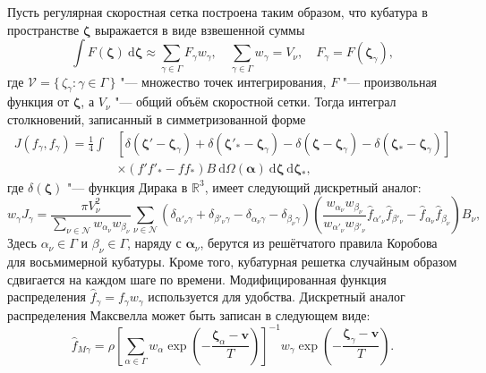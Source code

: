 \documentclass[10pt]{article}
\newcommand{\dd}{\:\mathrm{d}}
\newcommand{\dzeta}{\boldsymbol{\dd\zeta}}
\newcommand{\bzeta}{\boldsymbol{\zeta}}
\newcommand{\Nu}{\mathcal{N}}
\newcommand{\Set}[2]{\{\,{#1}:{#2}\,\}}
\begin{document}
Пусть регулярная скоростная сетка построена таким образом,
что кубатура в пространстве \(\bzeta\) выражается в виде взвешенной суммы
\begin{equation}\label{eq:zeta_cubature}
    \int F(\bzeta) \dzeta \approx \sum_{\gamma\in\Gamma} F_\gamma w_\gamma,
        \quad \sum_{\gamma\in\Gamma} w_\gamma = V_\nu,
        \quad F_\gamma = F(\bzeta_\gamma),
\end{equation}
где \(\mathcal{V} = \Set{\zeta_\gamma}{\gamma\in\Gamma}\) "--- множество точек интегрирования,
\(F\) "--- произвольная функция от \(\bzeta\),
а \(V_\nu\) "--- общий объём скоростной сетки.
Тогда интеграл столкновений, записанный в симметризованной форме
\begin{equation}\label{eq:symm_ci}
    \begin{aligned}
    J(f_\gamma, f_\gamma) = \frac14\int &\left[
        \delta(\bzeta'-\bzeta_\gamma) + \delta(\bzeta'_*-\bzeta_\gamma)
        - \delta(\bzeta-\bzeta_\gamma) - \delta(\bzeta_*-\bzeta_\gamma)\right] \\
        &\times(f'f'_* - ff_*)B \dd\Omega(\boldsymbol{\alpha}) \dzeta\dzeta_*,
    \end{aligned}
\end{equation}
где \(\delta(\bzeta)\) "--- функция Дирака в \(\mathbb{R}^3\),
имеет следующий дискретный аналог:
\begin{equation}\label{eq:discrete_symm_ci}
    w_\gamma J_\gamma = \frac{\pi V_\nu^2}{\sum_{\nu\in\Nu} w_{\alpha_\nu}w_{\beta_\nu}}
        \sum_{\nu\in\Nu} \left(
            \delta_{\alpha'_\nu\gamma} + \delta_{\beta'_\nu\gamma}
            - \delta_{\alpha_\nu\gamma} - \delta_{\beta_\nu\gamma}
        \right)\left(
            \frac{w_{\alpha_\nu}w_{\beta_\nu}}{w_{\alpha'_\nu}w_{\beta'_\nu}}
            \hat{f}_{\alpha'_\nu}\hat{f}_{\beta'_\nu} - \hat{f}_{\alpha_\nu}\hat{f}_{\beta_\nu}
        \right)B_\nu,
\end{equation}
Здесь \(\alpha_\nu\in\Gamma\) и \(\beta_\nu\in\Gamma\), наряду с \(\boldsymbol{\alpha}_\nu\),
берутся из решётчатого правила Коробова~\cite{Korobov1959, Sloan1994}
для восьмимерной кубатуры.
Кроме того, кубатурная решетка случайным образом сдвигается на каждом шаге по времени.
Модифицированная функция распределения \(\hat{f}_\gamma = f_\gamma w_\gamma\) используется для удобства.
Дискретный аналог распределения Максвелла может быть записан в следующем виде:
\begin{equation}\label{eq:discrete_Maxwell}
    \hat{f}_{M\gamma} = \rho\left[\sum_{\alpha\in\Gamma}w_\alpha\exp
            \left(-\frac{\bzeta_\alpha - \boldsymbol{v}}{T}\right)
        \right]^{-1}
        w_\gamma\exp\left(-\frac{\bzeta_\gamma - \boldsymbol{v}}{T}\right).
\end{equation}
\end{document}
